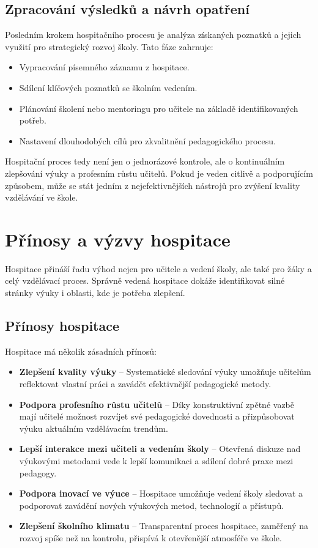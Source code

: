 \subsection{Zpracování výsledků a návrh opatření}

Posledním krokem hospitačního procesu je analýza získaných poznatků a jejich využití pro strategický rozvoj školy. Tato fáze zahrnuje:

\begin{itemize}
    \item Vypracování písemného záznamu z hospitace.
    \item Sdílení klíčových poznatků se školním vedením.
    \item Plánování školení nebo mentoringu pro učitele na základě identifikovaných potřeb.
    \item Nastavení dlouhodobých cílů pro zkvalitnění pedagogického procesu.
\end{itemize}

Hospitační proces tedy není jen o jednorázové kontrole, ale o kontinuálním zlepšování výuky a profesním růstu učitelů. Pokud je veden citlivě a podporujícím způsobem, může se stát jedním z nejefektivnějších nástrojů pro zvýšení kvality vzdělávání ve škole.

\section{Přínosy a výzvy hospitace}

Hospitace přináší řadu výhod nejen pro učitele a vedení školy, ale také pro žáky a celý vzdělávací proces. Správně vedená hospitace dokáže identifikovat silné stránky výuky i oblasti, kde je potřeba zlepšení.


\subsection{Přínosy hospitace}

Hospitace má několik zásadních přínosů:

\begin{itemize}
    \item \textbf{Zlepšení kvality výuky} – Systematické sledování výuky umožňuje učitelům reflektovat vlastní práci a zavádět efektivnější pedagogické metody.
    \item \textbf{Podpora profesního růstu učitelů} – Díky konstruktivní zpětné vazbě mají učitelé možnost rozvíjet své pedagogické dovednosti a přizpůsobovat výuku aktuálním vzdělávacím trendům.
    \item \textbf{Lepší interakce mezi učiteli a vedením školy} – Otevřená diskuze nad výukovými metodami vede k lepší komunikaci a sdílení dobré praxe mezi pedagogy.
    \item \textbf{Podpora inovací ve výuce} – Hospitace umožňuje vedení školy sledovat a podporovat zavádění nových výukových metod, technologií a přístupů.
    \item \textbf{Zlepšení školního klimatu} – Transparentní proces hospitace, zaměřený na rozvoj spíše než na kontrolu, přispívá k otevřenější atmosféře ve škole.
\end{itemize}

